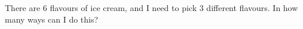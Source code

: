 There are $6$ flavours of ice cream, and I need to pick $3$ different flavours. In how many ways can I do this?
